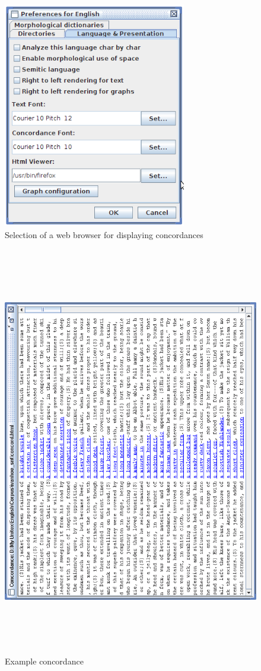 \bigskip
\begin{figure}[!ht]
\begin{center}
\includegraphics[width=8cm]{resources/img/fig4-7.png}
\caption{Selection of a web browser for displaying
concordances\label{fig-browser-selection}}
\end{center}
\end{figure}

\bigskip
\begin{figure}[!p]
\begin{center}
\includegraphics[height=18cm]{resources/img/fig4-8.png}
\caption{Example concordance\label{fig-example-concordance}}
\end{center}
\end{figure}

